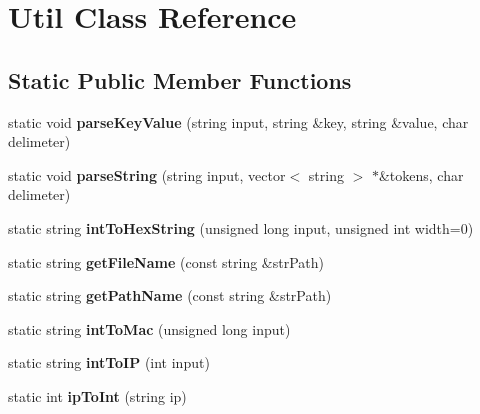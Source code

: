 \hypertarget{classUtil}{\section{\-Util \-Class \-Reference}
\label{classUtil}
}
\subsection*{\-Static \-Public \-Member \-Functions}
\begin{DoxyCompactItemize}
\item 
\hypertarget{classUtil_ad8d1a369e12534be0c38f3e1e64229aa}{static void {\bfseries parse\-Key\-Value} (string input, string \&key, string \&value, char delimeter)}\label{classUtil_ad8d1a369e12534be0c38f3e1e64229aa}

\item 
\hypertarget{classUtil_a5bb235fb6bd87097e583f0c252339054}{static void {\bfseries parse\-String} (string input, vector$<$ string $>$ $\ast$\&tokens, char delimeter)}\label{classUtil_a5bb235fb6bd87097e583f0c252339054}

\item 
\hypertarget{classUtil_aea8750742ed93003e0dfedecb9396aab}{static string {\bfseries int\-To\-Hex\-String} (unsigned long input, unsigned int width=0)}\label{classUtil_aea8750742ed93003e0dfedecb9396aab}

\item 
\hypertarget{classUtil_a085b5b54ea02e7c982a0165ef155e6b2}{static string {\bfseries get\-File\-Name} (const string \&str\-Path)}\label{classUtil_a085b5b54ea02e7c982a0165ef155e6b2}

\item 
\hypertarget{classUtil_a9c611183c80b185204c6b603b21ef893}{static string {\bfseries get\-Path\-Name} (const string \&str\-Path)}\label{classUtil_a9c611183c80b185204c6b603b21ef893}

\item 
\hypertarget{classUtil_a1a1097991d3f9adf4476390900380457}{static string {\bfseries int\-To\-Mac} (unsigned long input)}\label{classUtil_a1a1097991d3f9adf4476390900380457}

\item 
\hypertarget{classUtil_ae6bddd0c75297cfbfa4771446471e14a}{static string {\bfseries int\-To\-I\-P} (int input)}\label{classUtil_ae6bddd0c75297cfbfa4771446471e14a}

\item 
\hypertarget{classUtil_ac40cdaef005e8bcd724e18222ee3b9b3}{static int {\bfseries ip\-To\-Int} (string ip)}\label{classUtil_ac40cdaef005e8bcd724e18222ee3b9b3}


\end{DoxyCompactItemize}
